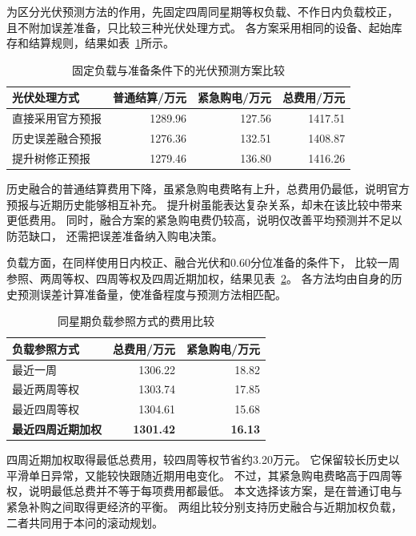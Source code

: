 为区分光伏预测方法的作用，先固定四周同星期等权负载、不作日内负载校正，
且不附加误差准备，只比较三种光伏处理方式。
各方案采用相同的设备、起始库存和结算规则，结果如表~\ref{tab:q3_candidate}所示。

\begin{table}[H]
\centering
\caption{固定负载与准备条件下的光伏预测方案比较}
\label{tab:q3_candidate}
\begin{tabular}{lrrr}
\toprule
光伏处理方式 & 普通结算/万元 & 紧急购电/万元 & 总费用/万元\\
\midrule
直接采用官方预报 &1289.96&127.56&1417.51\\
历史误差融合预报 &1276.36&132.51&1408.87\\
提升树修正预报 &1279.46&136.80&1416.26\\
\bottomrule
\end{tabular}
\end{table}

历史融合的普通结算费用下降，虽紧急购电费略有上升，总费用仍最低，说明官方预报与近期历史能够相互补充。
提升树虽能表达复杂关系，却未在该比较中带来更低费用。
同时，融合方案的紧急购电费仍较高，说明仅改善平均预测并不足以防范缺口，
还需把误差准备纳入购电决策。

负载方面，在同样使用日内校正、融合光伏和0.60分位准备的条件下，
比较一周参照、两周等权、四周等权及四周近期加权，结果见表~\ref{tab:q3_load_compare}。
各方法均由自身的历史预测误差计算准备量，使准备程度与预测方法相匹配。

\begin{table}[H]
\centering
\caption{同星期负载参照方式的费用比较}
\label{tab:q3_load_compare}
\begin{tabular}{lrr}
\toprule
负载参照方式 & 总费用/万元 & 紧急购电/万元\\
\midrule
最近一周 &1306.22&18.82\\
最近两周等权 &1303.74&17.85\\
最近四周等权 &1304.61&15.68\\
\textbf{最近四周近期加权} &\textbf{1301.42}&\textbf{16.13}\\
\bottomrule
\end{tabular}
\end{table}

四周近期加权取得最低总费用，较四周等权节省约3.20万元。
它保留较长历史以平滑单日异常，又能较快跟随近期用电变化。
不过，其紧急购电费略高于四周等权，说明最低总费并不等于每项费用都最低。
本文选择该方案，是在普通订电与紧急补购之间取得更经济的平衡。
两组比较分别支持历史融合与近期加权负载，二者共同用于本问的滚动规划。

